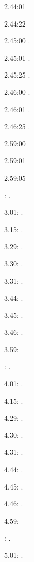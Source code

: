 \documentclass[italian]{article}
\begin{document}
2.44:01   

2.44:22   

2.45:00   .

2.45:01   .

2.45:25   .

2.46:00   .

2.46:01   .

2.46:25   .

2.59:00   

2.59:01   

2.59:05   

:  .

3.01:   . 

3.15:   . 

3.29:   . 

3.30:   .

3.31:   .

3.44:   .

3.45:   .

3.46:   .

3.59:   

:  .

4.01:   . 

4.15:   . 

4.29:   . 

4.30:   .

4.31:   .

4.44:   .

4.45:   .

4.46:   .

4.59:   

:  .

5.01:   . 
\end{document}
